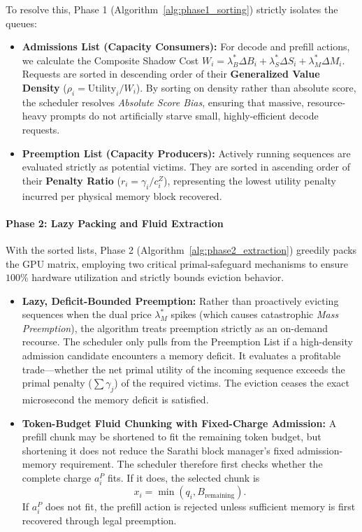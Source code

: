 \documentclass[11pt]{article}
\begin{document}
To resolve this, Phase 1 (Algorithm~\ref{alg:phase1_sorting}) strictly isolates the queues:
\begin{itemize}
    \item \textbf{Admissions List (Capacity Consumers):} For decode and prefill actions, we calculate the Composite Shadow Cost $W_i = \lambda_B^* \Delta B_i + \lambda_S^* \Delta S_i + \lambda_M^* \Delta M_i$. Requests are sorted in descending order of their \textbf{Generalized Value Density} ($\rho_i = \text{Utility}_i / W_i$). By sorting on density rather than absolute score, the scheduler resolves \textit{Absolute Score Bias}, ensuring that massive, resource-heavy prompts do not artificially starve small, highly-efficient decode requests.
    \item \textbf{Preemption List (Capacity Producers):} Actively running sequences are evaluated strictly as potential victims. They are sorted in ascending order of their \textbf{Penalty Ratio} ($r_i = \gamma_i / c_i^Z$), representing the lowest utility penalty incurred per physical memory block recovered.
\end{itemize}

\paragraph{Phase 2: Lazy Packing and Fluid Extraction}
With the sorted lists, Phase 2 (Algorithm~\ref{alg:phase2_extraction}) greedily packs the GPU matrix, employing two critical primal-safeguard mechanisms to ensure $100\%$ hardware utilization and strictly bounds eviction behavior.

\begin{itemize}
    \item \textbf{Lazy, Deficit-Bounded Preemption:} Rather than proactively evicting sequences when the dual price $\lambda_M^*$ spikes (which causes catastrophic \textit{Mass Preemption}), the algorithm treats preemption strictly as an on-demand recourse. The scheduler only pulls from the Preemption List if a high-density admission candidate encounters a memory deficit. It evaluates a profitable trade—whether the net primal utility of the incoming sequence exceeds the primal penalty ($\sum \gamma_j$) of the required victims. The eviction ceases the exact microsecond the memory deficit is satisfied.
    \item \textbf{Token-Budget Fluid Chunking with Fixed-Charge Admission:}
    A prefill chunk may be shortened to fit the remaining token budget, but shortening it does not reduce the Sarathi block manager's fixed admission-memory requirement. The scheduler therefore first checks whether the complete charge \(a_i^P\) fits. If it does, the selected chunk is
    \[
    x_i
    =
    \min
    \left(
        q_i,
        B_{\mathrm{remaining}}
    \right).
    \]
    If \(a_i^P\) does not fit, the prefill action is rejected unless sufficient memory is first recovered through legal preemption.
\end{itemize}
\end{document}
